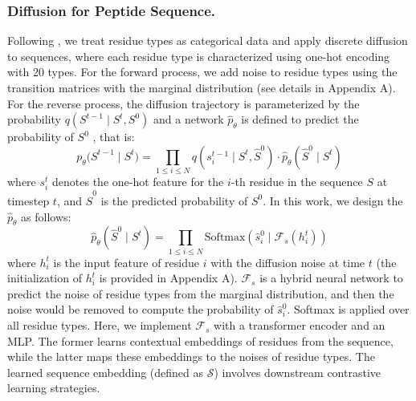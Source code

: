 \documentclass[letterpaper]{article}
\begin{document}
\subsubsection{Diffusion for Peptide Sequence.}
Following \citet{anandProteinStructure2022}, we treat residue types as categorical data and apply discrete diffusion to sequences, where each residue type is characterized using one-hot encoding with 20 types. For the forward process, we add noise to residue types using the transition matrices with the marginal distribution \cite{austinStructuredDenoising2021, vignacDiGressDiscrete2023} (see details in Appendix A). For the reverse process, the diffusion trajectory is parameterized by the probability $q(S^{t-1}\mid S^t,S^0)$ and a network ${\hat{p}}_\theta$ is defined to predict the probability of $S^0$ \cite{austinStructuredDenoising2021}, that is:
\begin{equation}
p_\theta\big(S^{t-1}\mid S^t\big)=\prod_{1\leq i\leq N}q(s_i^{t-1}\mid S^t,\hat{S}^0)\cdot\hat{p}_\theta(\hat{S}^0\mid S^t)
\end{equation}
where $s_i^t$ denotes the one-hot feature for the $i$-th residue in the sequence $S$ at timestep $t$, and $\hat{S}^0$ is the predicted probability of $S^0$. In this work, we design the ${\hat{p}}_\theta$ as follows:
\begin{equation}
\hat{p}_{\theta}\left(\hat{S}^{0}\mid S^{t}\right)=\prod_{1\leq i\leq N}\text{Softmax}\left(\hat{s}_{i}^{0}\mid \mathcal{F}_s\left(h_{i}^{t}\right)\right)
\end{equation}
where $h_{i}^t$ is the input feature of residue $i$ with the diffusion noise at time $t$ (the initialization of $h_{i}^t$ is provided in Appendix A). $\mathcal{F}_s$ is a hybrid neural network to predict the noise of residue types from the marginal distribution, and then the noise would be removed to compute the probability of $\hat{s}_i^0$. Softmax is applied over all residue types. Here, we implement $\mathcal{F}_s$ with a transformer encoder and an MLP. The former learns contextual embeddings of residues from the sequence, while the latter maps these embeddings to the noises of residue types. The learned sequence embedding (defined as $\mathcal{S}$) involves downstream contrastive learning strategies.
\end{document}
